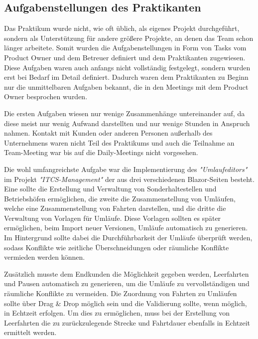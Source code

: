 \subsection{Aufgabenstellungen des Praktikanten}\label{sec:aufgabenstellung-praktikant}

    Das Praktikum wurde nicht, wie oft üblich, als eigenes Projekt durchgeführt, sondern als
    Unterstützung für andere größere Projekte, an denen das Team schon länger arbeitete. Somit wurden die Aufgabenstellungen in Form von Tasks vom Product Owner und dem Betreuer definiert 
    und dem Praktikanten zugewiesen. Diese Aufgaben waren auch anfangs nicht vollständig festgelegt, sondern wurden erst bei Bedarf im Detail definiert. Dadurch waren dem Praktikanten zu Beginn
    nur die unmittelbaren Aufgaben bekannt, die in den Meetings mit dem Product Owner besprochen wurden.
    
    Die ersten Aufgaben wiesen nur wenige Zusammenhänge untereinander auf, da diese meist nur wenig Aufwand darstellten und nur wenige Stunden in Anspruch nahmen. 
    Kontakt mit Kunden oder anderen Personen außerhalb des Unternehmens waren nicht Teil des Praktikums und auch die Teilnahme an Team-Meeting war bis auf die Daily-Meetings nicht vorgesehen.
    
    Die wohl umfangreichste Aufgabe war die Implementierung des  \emph{"Umlaufeditors"} im Projekt \emph{"ITCS-Management"} der aus drei verschiedenen Blazor-Seiten besteht. Eine sollte die Erstellung 
    und Verwaltung von Sonderhaltestellen und Betriebshöfen ermöglichen, die zweite die Zusammenstellung von Umläufen, welche eine Zusammenstellung von Fahrten darstellen, und 
    die dritte die Verwaltung von Vorlagen für Umläufe. Diese Vorlagen sollten es später ermöglichen, beim Import neuer Versionen, Umläufe automatisch zu generieren. Im Hintergrund sollte dabei
    die Durchführbarkeit der Umläufe überprüft werden, sodass Konflikte wie zeitliche Überschneidungen oder räumliche Konflikte vermieden werden können. 
    
    Zusätzlich musste dem 
    Endkunden die Möglichkeit gegeben werden, Leerfahrten und Pausen automatisch zu generieren, um die Umläufe zu vervollständigen und räumliche Konflikte zu vermeiden. Die Zuordnung 
    von Fahrten zu Umläufen sollte über Drag \& Drop möglich sein und die Validierung sollte, wenn möglich, in Echtzeit erfolgen. Um dies zu ermöglichen, muss bei der Erstellung von Leerfahrten die zu 
    zurückzulegende Strecke und Fahrtdauer ebenfalls in Echtzeit ermittelt werden.
    
